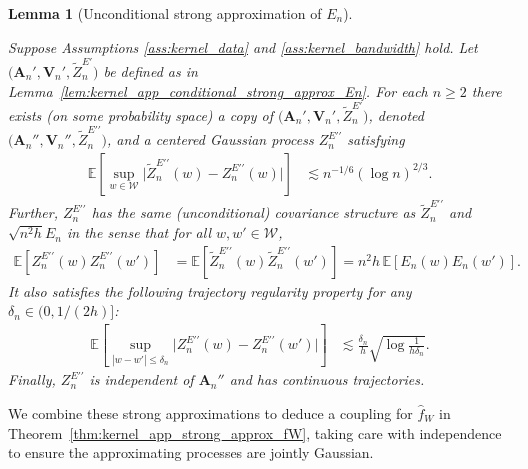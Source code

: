 \documentclass[11pt,lof]{puthesis}
\newcommand{\E}{\ensuremath{\mathbb{E}}}
\newcommand{\bA}{\ensuremath{\mathbf{A}}}
\newcommand{\bV}{\ensuremath{\mathbf{V}}}
\newcommand{\cW}{\ensuremath{\mathcal{W}}}
\newcommand{\dprime}{\ensuremath{\prime\prime}}
\theoremstyle{break}
\newtheorem{lemma}{Lemma}[section]
\theoremstyle{proof}
\begin{document}
\begin{lemma}[Unconditional strong approximation of $E_n$]
  \label{lem:kernel_app_unconditional_strong_approx_En}

  Suppose Assumptions
  \ref{ass:kernel_data} and \ref{ass:kernel_bandwidth} hold.
  Let $\big(\bA_n', \bV_n', \tilde Z_n^{E\prime}\big)$
  be defined as in
  Lemma~\ref{lem:kernel_app_conditional_strong_approx_En}.
  For each $n \geq 2$
  there exists
  (on some probability space)
  a copy of
  $\big(\bA_n', \bV_n', \tilde Z_n^{E\prime}\big)$,
  denoted
  $\big(\bA_n'', \bV_n'', \tilde Z_n^{E\dprime}\big)$,
  and a centered
  Gaussian process
  $Z^{E\dprime}_n$
  satisfying
  \begin{align*}
    \E\left[
      \sup_{w \in \cW}
      \big|\tilde Z_n^{E\dprime}(w) - Z_n^{E\dprime}(w)\big|
    \right]
    &\lesssim
    n^{-1/6} (\log n)^{2/3}.
  \end{align*}
  Further,
  $Z_n^{E\dprime}$ has the same
  (unconditional) covariance structure as
  $\tilde Z_n^{E\dprime}$ and $\sqrt{n^2h} E_n$
  in the sense that for all $w, w' \in \cW$,
  \begin{align*}
    \E\left[
      Z_n^{E\dprime}(w)
      Z_n^{E\dprime}(w')
    \right]
    &=
    \E\left[
      \tilde Z_n^{E\dprime}(w)
      \tilde Z_n^{E\dprime}(w')
    \right]
    =
    n^2h \,
    \E\left[
      E_n(w)
      E_n(w')
    \right].
  \end{align*}
  It also satisfies the following
  trajectory regularity property
  for any $\delta_n \in (0, 1/(2h)]$:
  \begin{align*}
    \E\left[
      \sup_{|w-w'| \leq \delta_n}
      \big|
      Z_n^{E\dprime}(w)
      - Z_n^{E\dprime}(w')
      \big|
    \right]
    &\lesssim
    \frac{\delta_n}{h}
    \sqrt{\log \frac{1}{h\delta_n}}.
  \end{align*}
  Finally, $Z_n^{E\dprime}$ is independent of $\bA_n''$
  and has continuous trajectories.

\end{lemma}

We combine these strong approximations to deduce a coupling for $\hat f_W$ in
Theorem~\ref{thm:kernel_app_strong_approx_fW}, taking care with independence
to ensure the approximating processes are jointly Gaussian.
\end{document}
